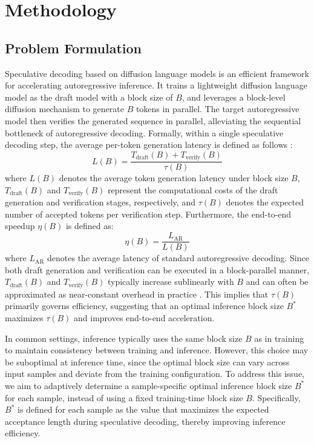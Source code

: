 \documentclass{article}
\begin{document}
\section{Methodology}
\subsection{Problem Formulation}
Speculative decoding based on diffusion language models \cite{li2025diffuspecunlockingdiffusionlanguage,sandler2025specdiff2scalingdiffusiondrafter,samragh2025llmknowsfutureuncovering,chen2026dflash} is an efficient framework for accelerating autoregressive inference. It trains a lightweight diffusion language model as the draft model with a block size of $B$, and leverages a block-level diffusion mechanism to generate $B$ tokens in parallel. The target autoregressive model then verifies the generated sequence in parallel, alleviating the sequential bottleneck of autoregressive decoding. Formally, within a single speculative decoding step, the average per-token generation latency is defined as follows \cite{chen2026dflash}:
\begin{equation}
L(B) = \frac{T_{\text{draft}}(B) + T_{\text{verify}}(B)}{\tau(B)}
\end{equation}
where $L(B)$ denotes the average token generation latency under block size $B$, $T_{\text{draft}}(B)$ and $T_{\text{verify}}(B)$ represent the computational costs of the draft generation and verification stages, respectively, and $\tau(B)$ denotes the expected number of accepted tokens per verification step. Furthermore, the end-to-end speedup $\eta(B)$ is defined as:
\begin{equation}
\eta(B) = \frac{L_{\text{AR}}}{L(B)}
\end{equation}
where $L_{\text{AR}}$ denotes the average latency of standard autoregressive decoding. Since both draft generation and verification can be executed in a block-parallel manner, $T_{\text{draft}}(B)$ and $T_{\text{verify}}(B)$ typically increase sublinearly with $B$ and can often be approximated as near-constant overhead in practice \cite{hooper2025speed,stern2018blockwise,santilli2023accelerating}. This implies that $\tau(B)$ primarily governs efficiency, suggesting that an optimal inference block size $B^*$ maximizes $\tau(B)$ and improves end-to-end acceleration.

In common settings, inference typically uses the same block size $B$ as in training to maintain consistency between training and inference. However, this choice may be suboptimal at inference time, since the optimal block size can vary across input samples and deviate from the training configuration. To address this issue, we aim to adaptively determine a sample-specific optimal inference block size $B^*$ for each sample, instead of using a fixed training-time block size $B$. Specifically, $B^*$ is defined for each sample as the value that maximizes the expected acceptance length during speculative decoding, thereby improving inference efficiency.
\end{document}
